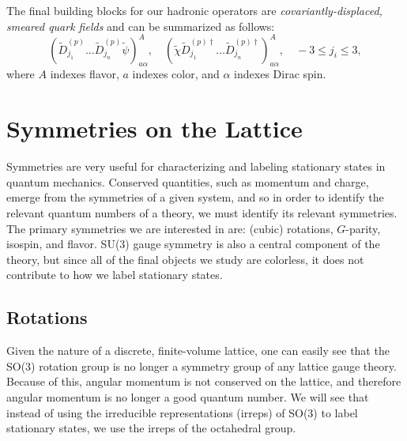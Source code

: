     The final building blocks for our hadronic operators are \emph{covariantly-displaced, smeared quark fields} and can be summarized as follows:
    \begin{equation}
        \boxed{\left(\widetilde{D}_{j_{1}}^{(p)} \ldots \widetilde{D}_{j_{n}}^{(p)} \widetilde{\psi}\right)_{a \alpha}^{A}, \quad\left(\widetilde{\chi} \widetilde{D}_{j_{1}}^{(p) \dagger} \ldots \widetilde{D}_{j_{n}}^{(p) \dagger}\right)_{a \alpha}^{A}, \quad-3 \leq j_{i} \leq 3,}
    \end{equation}
    where $A$ indexes flavor, $a$ indexes color, and $\alpha$ indexes Dirac spin.
    \section{Symmetries on the Lattice}
    Symmetries are very useful for characterizing and labeling stationary states in quantum mechanics. Conserved quantities, such as momentum and charge, emerge from the symmetries of a given system, and so in order to identify the relevant quantum numbers of a theory, we must identify its relevant symmetries. The primary symmetries we are interested in are: (cubic) rotations, $G$-parity, isospin, and flavor. SU(3) gauge symmetry is also a central component of the theory, but since all of the final objects we study are colorless, it does not contribute to how we label stationary states.
    
    \subsection{Rotations}
    Given the nature of a discrete, finite-volume lattice, one can easily see that the SO(3) rotation group is no longer a symmetry group of any lattice gauge theory. Because of this, angular momentum is not conserved on the lattice, and therefore angular momentum is no longer a good quantum number. We will see that instead of using the irreducible representations (irreps) of SO(3) to label stationary states, we use the irreps of the octahedral group.
 
